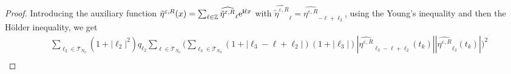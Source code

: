\documentclass[a4paper]{amsart}
\begin{document}
\begin{proof}
   Introducing the auxiliary function $\tilde{\eta}^{\varepsilon,R}(x)=\sum_{\ell \in \mathbb{Z}} \widehat{\tilde{\eta}^{\varepsilon,R}}_\ell {\rm e}^{{\bf i} \ell x}$ with $\widehat{\tilde{\eta}^{\varepsilon,R}}_\ell=\widehat{\eta^{\varepsilon,R}}_{-\ell+\ell_2}$, using the Young's inequality and then the Hölder inequality, we get
   \begin{align*}
       &\sum_{\ell_2\in\mathcal{T}_{N_0}} (1+|\ell_2|^2) q_{\ell_2}\sum_{\ell\in\mathcal{T}_{N_0}}  \big(\sum_{\ell_3\in\mathcal{T}_{N_0}} (1+|\ell_3-\ell+\ell_2|)(1+|\ell_3|) |\widehat{\eta^{\varepsilon,R}}_{\ell_3-\ell+\ell_2}(t_k)| |\widehat{\eta^{\varepsilon,R}}_{\ell_3}(t_k)| \big)^2\\

\end{align*}
\end{proof}
\end{document}

